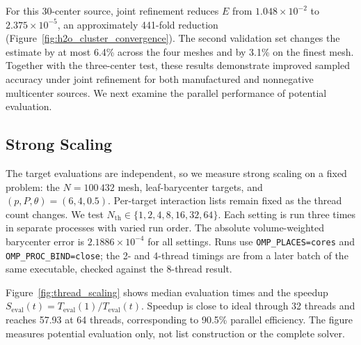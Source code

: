 \documentclass[a4paper,pdflatex,sn-mathphys-num]{sn-jnl}
\theoremstyle{thmstyleone}
\begin{document}
For this 30-center source, joint refinement reduces $E$ from $1.048\times10^{-2}$ to $2.375\times10^{-5}$, an approximately 441-fold reduction (Figure~\ref{fig:h2o_cluster_convergence}). The second validation set changes the estimate by at most 6.4\% across the four meshes and by 3.1\% on the finest mesh. Together with the three-center test, these results demonstrate improved sampled accuracy under joint refinement for both manufactured and nonnegative multicenter sources. We next examine the parallel performance of potential evaluation.

\subsection{Strong Scaling}
\label{sec:thread_scaling}

The target evaluations are independent, so we measure strong scaling on a fixed problem: the $N=100\,432$ mesh, leaf-barycenter targets, and $(p,P,\theta)=(6,4,0.5)$. Per-target interaction lists remain fixed as the thread count changes. We test $N_{\mathrm{th}}\in\{1,2,4,8,16,32,64\}$. Each setting is run three times in separate processes with varied run order. The absolute volume-weighted barycenter error is $2.1886\times10^{-4}$ for all settings. Runs use \texttt{OMP\_PLACES=cores} and \texttt{OMP\_PROC\_BIND=close}; the 2- and 4-thread timings are from a later batch of the same executable, checked against the 8-thread result.

Figure~\ref{fig:thread_scaling} shows median evaluation times and the speedup $S_{\mathrm{eval}}(t)=T_{\mathrm{eval}}(1)/T_{\mathrm{eval}}(t)$. Speedup is close to ideal through 32 threads and reaches 57.93 at 64 threads, corresponding to 90.5\% parallel efficiency. The figure measures potential evaluation only, not list construction or the complete solver.
\end{document}
